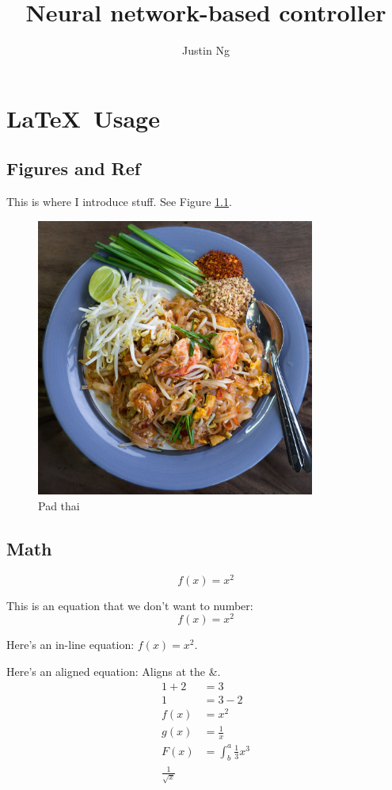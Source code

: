 \documentclass[12pt,letterpaper,titlepage]{report}
\title{Neural network-based controller}
\author{Justin Ng}
\begin{document}

\newpage
{}
\tableofcontents
\listoffigures
\listoftables


\chapter{\LaTeX\ Usage}

\section{Figures and Ref}
This is where I introduce stuff. See Figure \ref{fig:padthai}.

\begin{figure}[H]   %
	\centering
	\includegraphics[width=3.6in]{images/padthai.jpg}
	\caption{Pad thai}
	\label{fig:padthai}
\end{figure}



\section{Math}

\begin{equation}
	f(x) = x^2
\end{equation}


This is an equation that we don't want to number: $$f(x) = x^2$$

Here's an in-line equation: $f(x) = x^2$.

Here's an aligned equation: Aligns at the \&.
\begin{align*}
	1 + 2 & = 3                       \\
	1     & = 3 - 2                   \\
	f(x)  & = x^2                     \\
	g(x)  & = \frac{1}{x}             \\
	F(x)  & = \int^a_b \frac{1}{3}x^3 \\
	\frac{1}{\sqrt{x}}
\end{align*}
\end{document}

